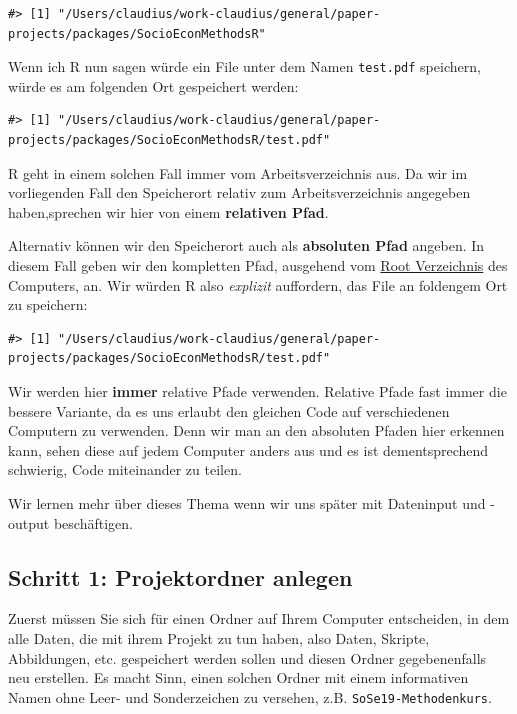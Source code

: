 \documentclass[]{tufte-book}
\begin{document}
\begin{verbatim}
#> [1] "/Users/claudius/work-claudius/general/paper-projects/packages/SocioEconMethodsR"
\end{verbatim}

Wenn ich R nun sagen würde ein File unter dem Namen \texttt{test.pdf}
speichern, würde es am folgenden Ort gespeichert werden:

\begin{verbatim}
#> [1] "/Users/claudius/work-claudius/general/paper-projects/packages/SocioEconMethodsR/test.pdf"
\end{verbatim}

R geht in einem solchen Fall immer vom Arbeitsverzeichnis aus. Da wir im
vorliegenden Fall den Speicherort relativ zum Arbeitsverzeichnis
angegeben haben,sprechen wir hier von einem \textbf{relativen Pfad}.

Alternativ können wir den Speicherort auch als \textbf{absoluten Pfad}
angeben. In diesem Fall geben wir den kompletten Pfad, ausgehend vom
\href{https://de.wikipedia.org/wiki/Stammverzeichnis}{Root Verzeichnis}
des Computers, an. Wir würden R also \emph{explizit} auffordern, das
File an foldengem Ort zu speichern:

\begin{verbatim}
#> [1] "/Users/claudius/work-claudius/general/paper-projects/packages/SocioEconMethodsR/test.pdf"
\end{verbatim}

Wir werden hier \textbf{immer} relative Pfade verwenden. Relative Pfade
fast immer die bessere Variante, da es uns erlaubt den gleichen Code auf
verschiedenen Computern zu verwenden. Denn wir man an den absoluten
Pfaden hier erkennen kann, sehen diese auf jedem Computer anders aus und
es ist dementsprechend schwierig, Code miteinander zu teilen.

Wir lernen mehr über dieses Thema wenn wir uns später mit Dateninput und
-output beschäftigen.

\subsection{Schritt 1: Projektordner
anlegen}\label{schritt-1-projektordner-anlegen}

Zuerst müssen Sie sich für einen Ordner auf Ihrem Computer entscheiden,
in dem alle Daten, die mit ihrem Projekt zu tun haben, also Daten,
Skripte, Abbildungen, etc. gespeichert werden sollen und diesen Ordner
gegebenenfalls neu erstellen. Es macht Sinn, einen solchen Ordner mit
einem informativen Namen ohne Leer- und Sonderzeichen zu versehen, z.B.
\texttt{SoSe19-Methodenkurs}.
\end{document}
